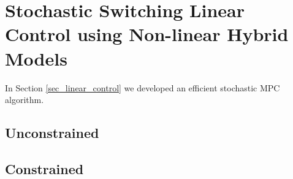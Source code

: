 \section{Stochastic Switching Linear Control using Non-linear Hybrid Models}
In Section \ref{sec_linear_control} we developed an efficient stochastic MPC algorithm.

\subsection{Unconstrained}

\subsection{Constrained} 


